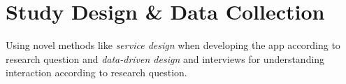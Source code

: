 \section{Study Design \& Data Collection}

Using novel methods like \textit{service design} when developing the app according to research question and \textit{data-driven design} and interviews for understanding interaction according to research question.










